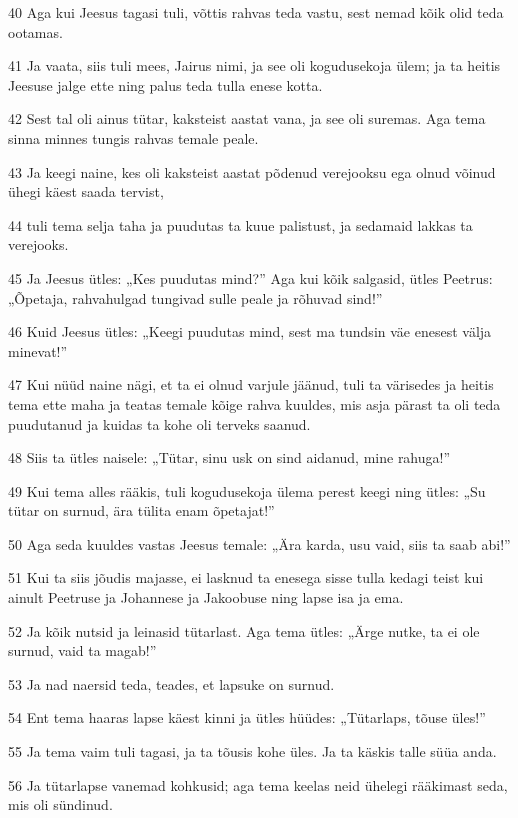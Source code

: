 \par 40 Aga kui Jeesus tagasi tuli, võttis rahvas teda vastu, sest nemad kõik olid teda ootamas.
\par 41 Ja vaata, siis tuli mees, Jairus nimi, ja see oli kogudusekoja ülem; ja ta heitis Jeesuse jalge ette ning palus teda tulla enese kotta.
\par 42 Sest tal oli ainus tütar, kaksteist aastat vana, ja see oli suremas. Aga tema sinna minnes tungis rahvas temale peale.
\par 43 Ja keegi naine, kes oli kaksteist aastat põdenud verejooksu ega olnud võinud ühegi käest saada tervist,
\par 44 tuli tema selja taha ja puudutas ta kuue palistust, ja sedamaid lakkas ta verejooks.
\par 45 Ja Jeesus ütles: „Kes puudutas mind?” Aga kui kõik salgasid, ütles Peetrus: „Õpetaja, rahvahulgad tungivad sulle peale ja rõhuvad sind!”
\par 46 Kuid Jeesus ütles: „Keegi puudutas mind, sest ma tundsin väe enesest välja minevat!”
\par 47 Kui nüüd naine nägi, et ta ei olnud varjule jäänud, tuli ta värisedes ja heitis tema ette maha ja teatas temale kõige rahva kuuldes, mis asja pärast ta oli teda puudutanud ja kuidas ta kohe oli terveks saanud.
\par 48 Siis ta ütles naisele: „Tütar, sinu usk on sind aidanud, mine rahuga!”
\par 49 Kui tema alles rääkis, tuli kogudusekoja ülema perest keegi ning ütles: „Su tütar on surnud, ära tülita enam õpetajat!”
\par 50 Aga seda kuuldes vastas Jeesus temale: „Ära karda, usu vaid, siis ta saab abi!”
\par 51 Kui ta siis jõudis majasse, ei lasknud ta enesega sisse tulla kedagi teist kui ainult Peetruse ja Johannese ja Jakoobuse ning lapse isa ja ema.
\par 52 Ja kõik nutsid ja leinasid tütarlast. Aga tema ütles: „Ärge nutke, ta ei ole surnud, vaid ta magab!”
\par 53 Ja nad naersid teda, teades, et lapsuke on surnud.
\par 54 Ent tema haaras lapse käest kinni ja ütles hüüdes: „Tütarlaps, tõuse üles!”
\par 55 Ja tema vaim tuli tagasi, ja ta tõusis kohe üles. Ja ta käskis talle süüa anda.
\par 56 Ja tütarlapse vanemad kohkusid; aga tema keelas neid ühelegi rääkimast seda, mis oli sündinud.


